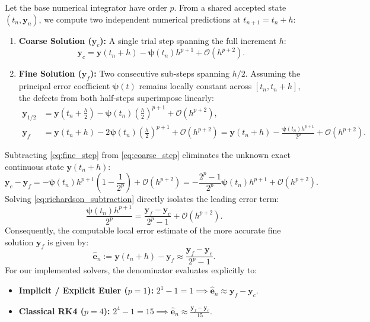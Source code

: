 \documentclass[11pt,a4paper]{article}
\theoremstyle{definition}
\theoremstyle{remark}
\begin{document}
Let the base numerical integrator have order $p$. From a shared accepted state $(t_n, \mathbf{y}_n)$, we compute two independent numerical predictions at $t_{n+1} = t_n + h$:
\begin{enumerate}
    \item \textbf{Coarse Solution ($\mathbf{y}_c$):} A single trial step spanning the full increment $h$:
    \begin{equation}
    \label{eq:coarse_step}
    \mathbf{y}_c = \mathbf{y}(t_n + h) - \boldsymbol{\psi}(t_n) h^{p+1} + \mathcal{O}(h^{p+2}).
    \end{equation}
    \item \textbf{Fine Solution ($\mathbf{y}_f$):} Two consecutive sub-steps spanning $h/2$. Assuming the principal error coefficient $\boldsymbol{\psi}(t)$ remains locally constant across $[t_n, t_n + h]$, the defects from both half-steps superimpose linearly:
    \begin{align}
    \mathbf{y}_{1/2} &= \mathbf{y}\left(t_n + \frac{h}{2}\right) - \boldsymbol{\psi}(t_n) \left(\frac{h}{2}\right)^{p+1} + \mathcal{O}(h^{p+2}), \label{eq:fine_half_step} \\
    \mathbf{y}_f &= \mathbf{y}(t_n + h) - 2 \boldsymbol{\psi}(t_n) \left(\frac{h}{2}\right)^{p+1} + \mathcal{O}(h^{p+2}) = \mathbf{y}(t_n + h) - \frac{\boldsymbol{\psi}(t_n) h^{p+1}}{2^p} + \mathcal{O}(h^{p+2}). \label{eq:fine_step}
    \end{align}
\end{enumerate}
Subtracting \eqref{eq:fine_step} from \eqref{eq:coarse_step} eliminates the unknown exact continuous state $\mathbf{y}(t_n + h)$:
\begin{equation}
\label{eq:richardson_subtraction}
\mathbf{y}_c - \mathbf{y}_f = -\boldsymbol{\psi}(t_n) h^{p+1} \left(1 - \frac{1}{2^p}\right) + \mathcal{O}(h^{p+2}) = -\frac{2^p - 1}{2^p} \boldsymbol{\psi}(t_n) h^{p+1} + \mathcal{O}(h^{p+2}).
\end{equation}
Solving \eqref{eq:richardson_subtraction} directly isolates the leading error term:
\begin{equation}
\label{eq:principal_error_isolated}
\frac{\boldsymbol{\psi}(t_n) h^{p+1}}{2^p} = \frac{\mathbf{y}_f - \mathbf{y}_c}{2^p - 1} + \mathcal{O}(h^{p+2}).
\end{equation}
Consequently, the computable local error estimate of the more accurate fine solution $\mathbf{y}_f$ is given by:
\begin{equation}
\label{eq:local_error_estimator}
\hat{\mathbf{e}}_n := \mathbf{y}(t_n + h) - \mathbf{y}_f \approx \frac{\mathbf{y}_f - \mathbf{y}_c}{2^p - 1}.
\end{equation}
For our implemented solvers, the denominator evaluates explicitly to:
\begin{itemize}
    \item \textbf{Implicit / Explicit Euler ($p=1$):} $2^1 - 1 = 1 \implies \hat{\mathbf{e}}_n \approx \mathbf{y}_f - \mathbf{y}_c$.
    \item \textbf{Classical RK4 ($p=4$):} $2^4 - 1 = 15 \implies \hat{\mathbf{e}}_n \approx \frac{\mathbf{y}_f - \mathbf{y}_c}{15}$.
\end{itemize}
\end{document}
